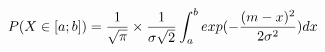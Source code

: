 \documentclass[preview]{standalone}
\begin{document}
\begin{align*}
P( X \in [a;b] ) = { \frac{1}{\sqrt{\pi}} } \times { \frac{1}{\sigma \sqrt{2}} } \int_a^b { exp(-{  {(m - x)^2} \over {2 \sigma^2} }) } \space dx
\end{align*}
\end{document}
